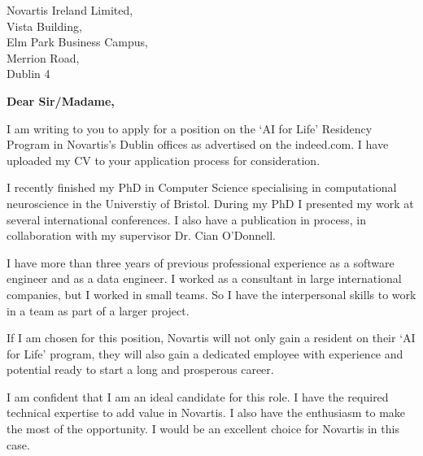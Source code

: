 \documentclass[11pt]{letter} %
\begin{document}

\begin{letter}{Novartis Ireland Limited, \\
Vista Building, \\
Elm Park Business Campus, \\
Merrion Road, \\
Dublin 4} %


  \opening{\textbf{Dear Sir/Madame,}}

  I am writing to you to apply for a position on the `AI for Life' Residency Program in Novartis's Dublin offices as advertised on the indeed.com. I have uploaded my CV to your application process for consideration.

  I recently finished my PhD in Computer Science specialising in computational neuroscience in the Universtiy of Bristol. During my PhD I presented my work at several international conferences.  I also have a publication in process, in collaboration with my supervisor Dr. Cian O'Donnell.

  I have more than three years of previous professional experience as a software engineer and as a data engineer. I worked as a consultant in large international companies, but I worked in small teams. So I have the interpersonal skills to work in a team as part of a larger project.

  If I am chosen for this position, Novartis will not only gain a resident on their `AI for Life' program, they will also gain a dedicated employee with experience and potential ready to start a long and prosperous career.

  I am confident that I am an ideal candidate for this role. I have the required technical expertise to add value in Novartis. I also have the enthusiasm to make the most of the opportunity. I would be an excellent choice for Novartis in this case.


\end{letter}
\end{document}
